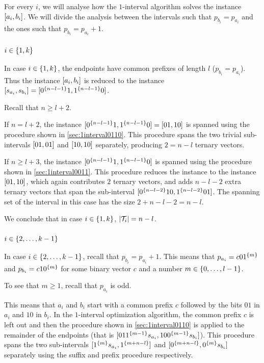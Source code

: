 For every $i$,
we will analyse how the $1$-interval algorithm solves
the instance $[a_i, b_i]$.
We will divide the analysis between the intervals
such that $p_{b_i} = p_{a_i}$
and the ones such that $p_{b_i} = p_{a_i} + 1$.

\subsubsection{$i \in \{1, k\}$}

In case $i \in \{1, k\}$,
the endpoints have common prefixes of length $l$
($p_{b_i} = p_{a_i}$).
Thus the instance $[a_i, b_i]$
is reduced to the instance
$[s_{a_i}, s_{b_i}]
= [0^{\{n-l-1\}} 1, 1^{\{n-l-1\}} 0]$.

Recall that $n \geq l + 2$.

If $n = l + 2$,
the instance
$[0^{\{n-l-1\}} 1, 1^{\{n-l-1\}} 0]
= [01, 10]$
is spanned using the procedure
shown in \cref{sec:1interval0110}.
This procedure spans the two trivial sub-intervals
$[01, 01]$ and $[10, 10]$
separately,
producing $2 = n-l$ ternary vectors.

If $n \geq l + 3$,
the instance
$[0^{\{n-l-1\}} 1, 1^{\{n-l-1\}} 0]$
is spanned using the procedure
shown in \cref{sec:1interval0011}.
This procedure reduces the instance
to the instance $[01, 10]$,
which again contributes $2$ ternary vectors,
and adds $n-l-2$ extra ternary vectors
that span the sub-interval
$[0^{\{n-l-2\}} 10, 1^{\{n-l-2\}} 01]$.
The spanning set of the interval in this case has the size
$2 + n - l - 2 = n - l$.

We conclude that in case $i \in \{1, k\}$,
$\lvert\mathcal{T}_i\rvert = n-l$.

\subsubsection{$i \in \{2, \ldots, k-1\}$}

In case $i \in \{2, \ldots, k-1\}$,
recall that $p_{b_i} = p_{a_i} + 1$.
This means that $p_{a_i} = c 0 1^{\{m\}}$
and $p_{b_i} = c 1 0^{\{m\}}$
for some binary vector $c$
and a number $m \in \{0, \ldots, l-1\}$.

To see that $m \geq 1$,
recall that $p_{a_i}$ is odd.

This means that $a_i$ and $b_i$
start with a common prefix $c$
followed by the bits $01$ in $a_i$
and $10$ in $b_i$.
In the $1$-interval optimization algorithm,
the common prefix $c$ is left out
and then the procedure
shown in \cref{sec:1interval0110}
is applied to the remainder of the endpoints
(that is
$[01 1^{\{m-1\}} s_{a_i}, 10 0^{\{m-1\}} s_{b_i}]$).
This procedure spans the two sub-intervals
$[1^{\{m\}} s_{a_i}, 1^{\{m+n-l\}}]$
and $[0^{\{m+n-l\}}, 0^{\{m\}} s_{b_i}]$
separately using the suffix and prefix procedure
respectively.


